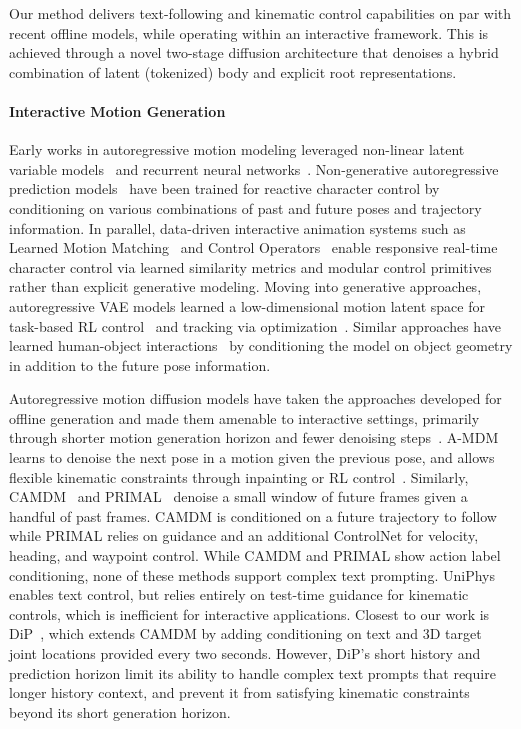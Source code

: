 Our method \method delivers text-following and kinematic control capabilities on par with recent offline models, while operating within an interactive framework. This is achieved through a novel two-stage diffusion architecture that denoises a hybrid combination of latent (tokenized) body and explicit root representations.

\paragraph{Interactive Motion Generation}
Early works in autoregressive motion modeling leveraged non-linear latent variable models~\cite{taylor2006modeling} and recurrent neural networks~\cite{fragkiadaki2015recurrent}.
Non-generative autoregressive prediction models~\cite{holden2017phase,starke2019neural,starke2022deepphase} have been trained for reactive character control by conditioning on various combinations of past and future poses and trajectory information. 
In parallel, data-driven interactive animation systems such as Learned Motion Matching~\cite{holden2020learned} and Control Operators~\cite{gou2025control} enable responsive real-time character control via learned similarity metrics and modular control primitives rather than explicit generative modeling.
Moving into generative approaches, autoregressive VAE models learned a low-dimensional motion latent space for task-based RL control~\cite{ling2020character,zhang2022wanderings} and tracking via optimization~\cite{rempe2021humor}.
Similar approaches have learned human-object interactions~\cite{starke2019neural,hassan2021stochastic,zhao2023synthesizing} by conditioning the model on object geometry in addition to the future pose information.

Autoregressive motion diffusion models have taken the approaches developed for offline generation and made them amenable to interactive settings, primarily through shorter motion generation horizon and fewer denoising steps~\cite{shi2024amdm,chen2024camdm,zhang2024tedi,ji2025towards,zhang2025primal,jiang2024autonomous,zhao2025DartControl,wu2025uniphys}.
A-MDM learns to denoise the next pose in a motion given the previous pose, and allows flexible kinematic constraints through inpainting or RL control~\cite{shi2024amdm}. 
Similarly, CAMDM~\cite{chen2024camdm} and PRIMAL~\cite{zhang2025primal} denoise a small window of future frames given a handful of past frames. CAMDM is conditioned on a future trajectory to follow while PRIMAL relies on guidance and an additional ControlNet for velocity, heading, and waypoint control. 
While CAMDM and PRIMAL show action label conditioning, none of these methods support complex text prompting.
UniPhys~\cite{wu2025uniphys} enables text control, but relies entirely on test-time guidance for kinematic controls, which is inefficient for interactive applications.
Closest to our work is DiP~\cite{tevet2025closd}, which extends CAMDM by adding conditioning on text and 3D target joint locations provided every two seconds. However, DiP's short history and prediction horizon limit its ability to handle complex text prompts that require longer history context, and prevent it from satisfying kinematic constraints beyond its short generation horizon.

